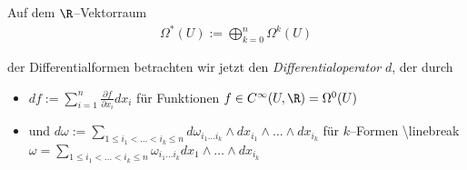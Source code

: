 \documentclass[letterpaper,10pt,english]{jupyterBook}
\begin{document}
\par
Auf dem \(\R\)–Vektorraum
\begin{align*}
\Omega^*(U) := \bigoplus_{k=0}^n\Omega^k(U)
\end{align*}
\par
der Differentialformen betrachten wir jetzt
den \emph{Differentialoperator} \(d\), der durch
\begin{itemize}
\item {} 
\par
\(df := \sum_{i=1}^n\frac{\partial f}{\partial x_i}dx_i\) für Funktionen
\(f\in C^\infty(U,\R) = \Omega^0(U)\)

\item {} 
\par
und \(d\omega := \sum_{1\leq i_1<\ldots<i_k\leq n}d\omega_{i_1\ldots i_k}
\wedge dx_{i_1}\wedge\ldots\wedge dx_{i_k}\) für \(k\)–Formen \textbackslash{}linebreak
\(\omega = \sum_{1\leq i_1<\ldots<i_k\leq n}\omega_{i_1\ldots i_k}
dx_1\wedge\ldots\wedge dx_{i_k}\)

\end{itemize}
\end{document}
